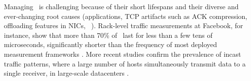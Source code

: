 %
Managing \bursts \ is challenging because of their short lifespans and their diverse and ever-changing root causes (applications, TCP artifacts such as ACK compression, offloading features in NICs, \etc \ \cite{high-resolution, bullet, measuring, dctcp, why, notes,ipbursts, coalescing, snap,valinor}). 
Rack-level traffic measurements at Facebook, for instance, show that more than 70\% of \bursts \ last for less than a few tens of microseconds, significantly shorter than the frequency of most deployed measurement frameworks \cite{high-resolution}. More recent studies confirm the prevalence of incast traffic patterns, where a large number of hosts simultaneously transmit data to a single receiver, in large-scale datacenters \cite{swift,milisampler,incast}.

